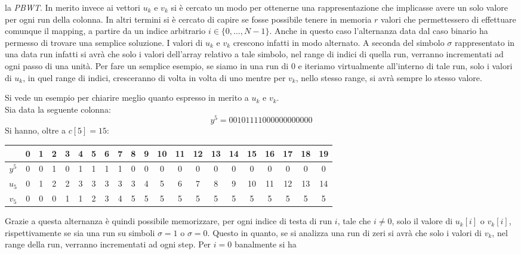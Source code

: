 la \textit{PBWT}. In merito invece ai vettori $u_k$ e $v_k$ si è cercato un modo
per ottenerne una rappresentazione che implicasse avere un solo valore per ogni
run della colonna. In altri termini si è cercato di capire se fosse possibile
tenere in memoria $r$ valori che permettessero di effettuare comunque il
mapping, a partire da un indice arbitrario $i\in\{0,\ldots,N-1\}$. Anche in
questo caso l'alternanza data dal caso binario ha permesso di trovare una
semplice soluzione. I valori di $u_k$ e $v_k$ crescono infatti in modo
alternato. A seconda del simbolo $\sigma$ rappresentato in una data run infatti
si avrà che solo i valori dell'array relativo a tale simbolo, nel range di
indici di quella run, verranno incrementati ad ogni passo di una unità. Per fare
un semplice esempio, se siamo in una run di 0 e iteriamo virtualmente
all'interno di tale run, solo i valori di $u_k$, in quel
range di indici, cresceranno di volta in volta di uno mentre per $v_k$, nello
stesso range, si avrà sempre lo stesso valore.
\begin{esempio}
  Si vede un esempio per chiarire meglio quanto espresso in merito a $u_k$ e
  $v_k$.\\
  Sia data la seguente colonna:
  \[y^5=00101111000000000000\]
  Si hanno, oltre a $c[5]=15$:
  \begin{table}[H]
    \footnotesize
    \centering
    \begin{tabular}{c||cc|c|c|cccc|cccccccccccc}
      & 0 & 1 & 2 & 3 & 4 & 5 & 6 & 7 & 8 & 9 & 10 & 11 & 12 & 13 & 14 & 15 & 16
      & 17 & 18 & 19\\
      \hline
      \hline
      $y^5$ & 0 & 0 & 1 & 0 & 1 & 1 & 1 & 1 & 0 & 0 & 0 & 0 & 0 & 0 & 0 & 0 & 0
      & 0 & 0 & 0\\
      \hline
      \hline
      $u_5$ & 0 & 1 & 2 & 2 & 3 & 3 & 3 & 3 & 3 & 4 & 5 & 6 & 7 & 8 & 9 & 10
      & 11 & 12 & 13 & 14\\
      \hline
      $v_5$ & 0 & 0 & 0 & 1 & 1 & 2 & 3 & 4 & 5 & 5 & 5 & 5 & 5 & 5 & 5 & 5 & 5
      & 5 & 5 & 5
    \end{tabular}
  \end{table}
\end{esempio}
Grazie a questa alternanza è quindi possibile memorizzare, per ogni indice di
testa di run $i$, tale che $i\neq 0$, solo il valore di $u_k[i]$ o $v_k[i]$,
rispettivamente se sia una run su simboli $\sigma=1$ o $\sigma=0$. Questo in
quanto, se si analizza una run di zeri si avrà che solo i valori di $v_k$, nel
range della run, verranno incrementati ad ogni step. Per $i=0$ banalmente si ha
